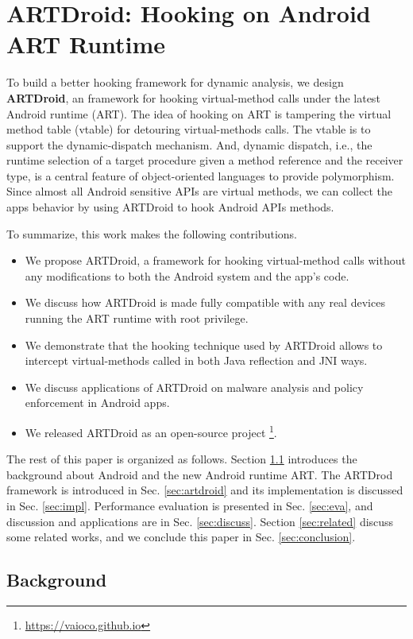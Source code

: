 \chapter{ARTDroid: Hooking on Android ART Runtime}

To build a better hooking framework for dynamic analysis, we design \textbf{ARTDroid}, an framework for hooking virtual-method calls under the latest Android runtime (ART). The idea of hooking on ART is tampering the virtual method table (vtable) for detouring virtual-methods calls. The vtable is to support the dynamic-dispatch mechanism. And, dynamic dispatch, i.e., the runtime selection of a target procedure given a method reference and the receiver type, is a central feature of object-oriented languages to provide polymorphism. Since almost all Android sensitive APIs are virtual methods, we can collect the apps behavior by using ARTDroid to hook Android APIs methods.

To summarize, this work makes the following contributions.

\begin{itemize}
\item We propose ARTDroid, a framework for hooking virtual-method calls without any modifications to both the Android system and the app's code.
\item We discuss how ARTDroid is made fully compatible with any real devices running the ART runtime with root privilege.
\item We demonstrate that the hooking technique used by ARTDroid allows to intercept virtual-methods called in both Java reflection and JNI ways.
\item We discuss applications of ARTDroid on malware analysis and policy enforcement in Android apps.
\item We released ARTDroid as an open-source project \footnote{\url{https://vaioco.github.io}}. 
\end{itemize}

The rest of this paper is organized as follows. Section \ref{sec:backg} introduces the background about Android and the new Android runtime ART. The ARTDrod framework is introduced in Sec. \ref{sec:artdroid} and its implementation is discussed in Sec. \ref{sec:impl}. Performance evaluation is presented in Sec. \ref{sec:eva}, and discussion and applications are in Sec. \ref{sec:discuss}. Section \ref{sec:related} discuss some related works, and we conclude this paper in Sec. \ref{sec:conclusion}.

\section{Background}
\label{sec:backg}

